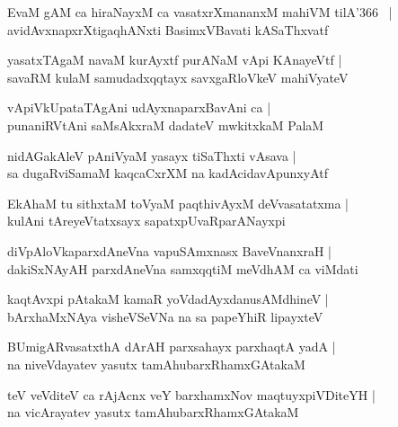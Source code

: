\documentclass[twoside,12pt,openright]{book}
\newcounter{shloka}[chapter]
\begin{document}
\begin{shloka}%
EvaM gAM ca hiraNayxM ca vasatxrXmananxM mahiVM tilA\char'366 ~|\\
avidAvxnapxrXtigaqhANxti BasimxVBavati kASaThxvatf
\end{shloka}

\begin{shloka}%
yasatxTAgaM navaM kurAyxtf purANaM vApi KAnayeVtf |\\
savaRM kulaM samudadxqqtayx savxgaRloVkeV mahiVyateV
\end{shloka}

\begin{shloka}%
vApiVkUpataTAgAni udAyxnaparxBavAni ca |\\
punaniRVtAni saMsAkxraM dadateV mwkitxkaM PalaM
\end{shloka}

\begin{shloka}%
nidAGakAleV pAniVyaM yasayx tiSaThxti vAsava |\\
sa dugaRviSamaM kaqcaCxrXM na kadAcidavApunxyAtf 
\end{shloka}

\begin{shloka}%
EkAhaM tu sithxtaM toVyaM paqthivAyxM deVvasatatxma |\\
kulAni tAreyeVtatxsayx sapatxpUvaRparANayxpi
\end{shloka}

\begin{shloka}%
diVpAloVkaparxdAneVna vapuSAmxnasx BaveVnanxraH |\\
dakiSxNAyAH parxdAneVna samxqqtiM meVdhAM ca viMdati
\end{shloka}

\begin{shloka}%
kaqtAvxpi pAtakaM kamaR yoVdadAyxdanusAMdhineV |\\
bArxhaMxNAya visheVSeVNa na sa papeYhiR lipayxteV
\end{shloka}

\begin{shloka}%
BUmigARvasatxthA dArAH parxsahayx parxhaqtA yadA |\\
na niveVdayatev yasutx tamAhubarxRhamxGAtakaM 
\end{shloka}

\begin{shloka}%
teV veVditeV ca rAjAcnx veY barxhamxNov maqtuyxpiVDiteYH |\\
na vicArayatev yasutx tamAhubarxRhamxGAtakaM 
\end{shloka}
\end{document}
